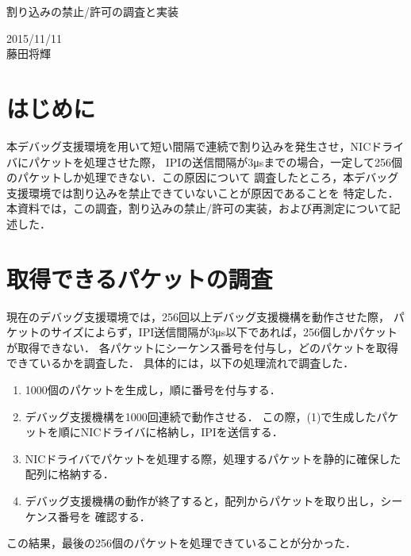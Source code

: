 \documentclass[12pt]{jsarticle}
\begin{document}

\begin{center}
    {\LARGE 割り込みの禁止/許可の調査と実装}
\end{center}

\begin{flushright}
    2015/11/11\\
    藤田将輝
\end{flushright}
\section{はじめに}
本デバッグ支援環境を用いて短い間隔で連続で割り込みを発生させ，NICドライバにパケットを処理させた際，
IPIの送信間隔が3μsまでの場合，一定して256個のパケットしか処理できない．この原因について
調査したところ，本デバッグ支援環境では割り込みを禁止できていないことが原因であることを
特定した．本資料では，この調査，割り込みの禁止/許可の実装，および再測定について記述した．

\section{取得できるパケットの調査}
現在のデバッグ支援環境では，256回以上デバッグ支援機構を動作させた際，
パケットのサイズによらず，IPI送信間隔が3μs以下であれば，256個しかパケットが取得できない．
各パケットにシーケンス番号を付与し，どのパケットを取得できているかを調査した．
具体的には，以下の処理流れで調査した．
\begin{enumerate}
    \item 1000個のパケットを生成し，順に番号を付与する．
    \item デバッグ支援機構を1000回連続で動作させる．
        この際，(1)で生成したパケットを順にNICドライバに格納し，IPIを送信する．
    \item NICドライバでパケットを処理する際，処理するパケットを静的に確保した配列に格納する．
    \item デバッグ支援機構の動作が終了すると，配列からパケットを取り出し，シーケンス番号を
        確認する．
\end{enumerate}
この結果，最後の256個のパケットを処理できていることが分かった．
\end{document}
